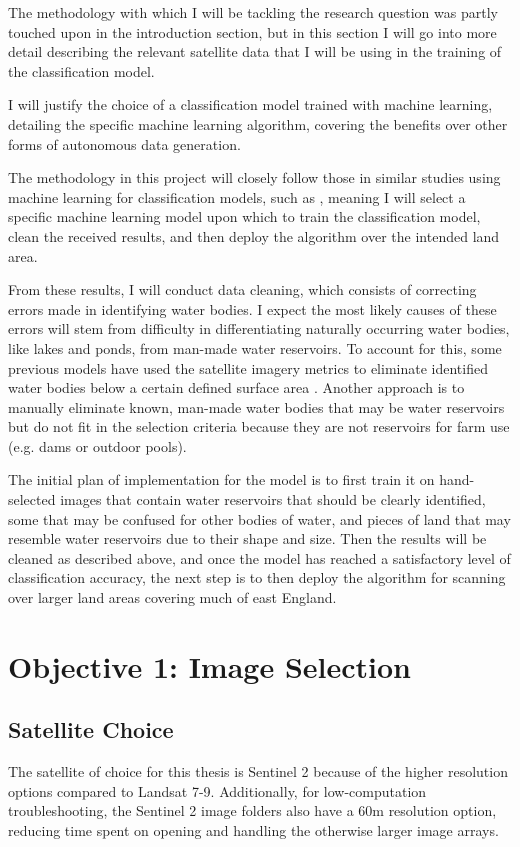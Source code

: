

The methodology with which I will be tackling the research question was partly touched upon in the introduction section, but in this section I will go into more detail describing the relevant satellite data that I will be using in the training of the classification model. 

I will justify the choice of a classification model trained with machine learning, detailing the specific machine learning algorithm, covering the benefits over other forms of autonomous data generation. 

The methodology in this project will closely follow those in similar studies using machine learning for classification models, such as \cite{ghansah_2022_monitoring}, meaning I will select a specific machine learning model upon which to train the classification model, clean the received results, and then deploy the algorithm over the intended land area. 

From these results, I will conduct data cleaning, which consists of correcting errors made in identifying water bodies. I expect the most likely causes of these errors will stem from difficulty in differentiating naturally occurring water bodies, like lakes and ponds, from man-made water reservoirs. To account for this, some previous models have used the satellite imagery metrics to eliminate identified water bodies below a certain defined surface area \citep{ghansah_2022_monitoring}. Another approach is to manually eliminate known, man-made water bodies that may be water reservoirs but do not fit in the selection criteria because they are not reservoirs for farm use (e.g. dams or outdoor pools). 

The initial plan of implementation for the model is to first train it on hand-selected images that contain water reservoirs that should be clearly identified, some that may be confused for other bodies of water, and pieces of land that may resemble water reservoirs due to their shape and size. Then the results will be cleaned as described above, and once the model has reached a satisfactory level of classification accuracy, the next step is to then deploy the algorithm for scanning over larger land areas covering much of east England. 

\section{Objective 1: Image Selection}
\subsection{Satellite Choice}
The satellite of choice for this thesis is Sentinel 2 because of the higher resolution options compared to Landsat 7-9. Additionally, for low-computation troubleshooting, the Sentinel 2 image folders also have a 60m resolution option, reducing time spent on opening and handling the otherwise larger image arrays. 

